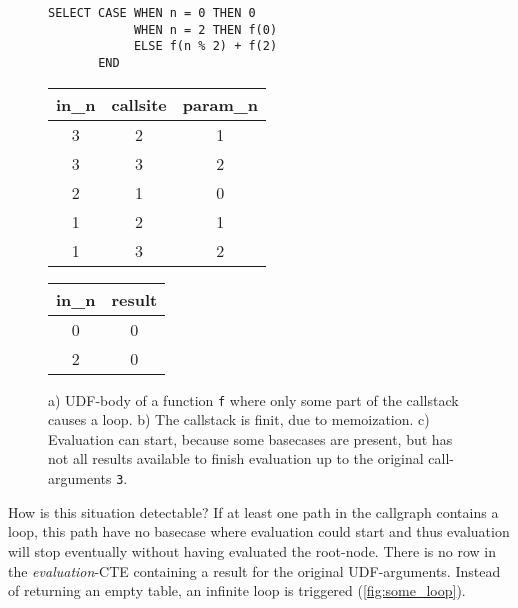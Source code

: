\begin{figure}[h!]\small
    \begin{minipage}[b]{.45\linewidth}
    \centering
    \begin{verbatim}
SELECT CASE WHEN n = 0 THEN 0
            WHEN n = 2 THEN f(0)
            ELSE f(n % 2) + f(2)
       END
    \end{verbatim}
    \subcaption{}\label{fig:some_loop_udf}
    \end{minipage}%
    \begin{minipage}[b]{.3\linewidth}
    \centering
    \begin{tabular}{c|c|c}
in\_n & callsite & param\_n \\\hline
3 & 2 & 1 \\
3 & 3 & 2 \\
2 & 1 & 0 \\
1 & 2 & 1 \\
1 & 3 & 2
    \end{tabular}
    \subcaption{}\label{fig:some_loop_callstack}
    \end{minipage}
    \begin{minipage}[b]{.2\linewidth}
    \centering
    \begin{tabular}{c|c}
in\_n & result \\\hline
0 & 0 \\\hline
2 & 0 \\
    \end{tabular}
    \subcaption{}\label{fig:some_loop_evaluation}
    \end{minipage}
    \caption{a) UDF-body of a function \texttt{f} where only some part of the callstack causes a loop. b) The callstack is finit, due to memoization. c) Evaluation can start, because some basecases are present, but has not all results available to finish evaluation up to the original call-arguments \texttt{3}.}\label{fig:some_loop}
\end{figure}

How is this situation detectable? If at least one path in the callgraph contains a loop, this path have no basecase where evaluation could start and thus evaluation will stop eventually without having evaluated the root-node. There is no row in the \textit{evaluation}-CTE containing a result for the original UDF-arguments. Instead of returning an empty table, an infinite loop is triggered (\autoref{fig:some_loop}).


\begin{figure}[h!]
    \centering
    \caption{}
    \label{macro:result_collection}
\end{figure}



